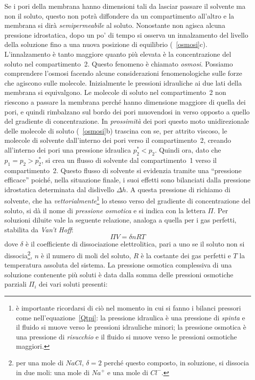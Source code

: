 Se i pori della membrana hanno dimensioni tali da lasciar passare il solvente ma non il soluto, questo non potrà diffondere da un compartimento all'altro e la membrana si dirà \textit{semipermeabile} al soluto. Nonostante non agisca alcuna pressione idrostatica, dopo un po' di tempo si osserva un innalzamento del livello della soluzione fino a una nuova posizione di equilibrio (\figurename~\ref{osmosi}c). L'innalzamento è tanto maggiore quanto più elevata è la concentrazione del soluto nel compartimento~2. Questo fenomeno è chiamato \textit{osmosi}. Possiamo comprendere l'osmosi facendo alcune considerazioni fenomenologiche sulle forze che agiscono sulle molecole. Inizialmente le pressioni idrauliche ai due lati della membrana si equivalgono. Le molecole di soluto nel compartimento~2 non riescono a passare la membrana perché hanno dimensione maggiore di quella dei pori, e quindi rimbalzano sul bordo dei pori muovendosi in verso opposto a quello del gradiente di concentrazione. In \textit{prossimità} dei pori questo moto unidirezionale delle molecole di soluto (\figurename~\ref{osmosi}b) trascina con se, per attrito viscoso, le molecole di solvente dall'interno dei pori verso il compartimento~2, creando all'interno dei pori una pressione idraulica $p_2^*<p_2$. Quindi ora, dato che $p_1 = p_2 > p_2^*$, si crea un flusso di solvente dal compartimento~1 verso il compartimento~2. Questo flusso di solvente si evidenzia tramite una ``pressione efficace'' poiché, nella situazione finale, i suoi effetti sono bilanciati dalla pressione idrostatica determinata dal dislivello $\Delta h$. A questa pressione di richiamo di solvente, che ha \textit{vettorialmente}\footnote{è importante ricordarsi di ciò nel momento in cui si fanno i bilanci pressori come nell'equazione~\ref{Qtpi}: la pressione idraulica è una pressione di \textit{spinta} e il fluido si muove verso le pressioni idrauliche minori; la pressione osmotica è una pressione di \textit{risucchio} e il fluido si muove verso le pressioni osmotiche maggiori.} lo stesso verso del gradiente di concentrazione del soluto, si dà il nome di \textit{pressione osmotica} e si indica con la lettera $\Pi$.
Per soluzioni diluite vale la seguente relazione, analoga a quella per i gas perfetti, stabilita da \textit{Van't Hoff}:
\begin{equation}\label{vhoff}
	\Pi V = \delta n R T
\end{equation}
dove $\delta$ è il coefficiente di dissociazione elettrolitica, pari a uno se il soluto non si dissocia\footnote{per una mole di $NaCl$, $\delta=2$ perché questo composto, in soluzione, si dissocia in due moli: una mole di $Na^+$ e una mole di $Cl^-$.}, $n$ è il numero di moli del soluto, $R$ è la costante dei gas perfetti e $T$ la temperatura assoluta del sistema. La pressione osmotica complessiva di una soluzione contenente più soluti è data dalla somma delle pressioni osmotiche parziali $\Pi_i$ dei vari soluti presenti:

